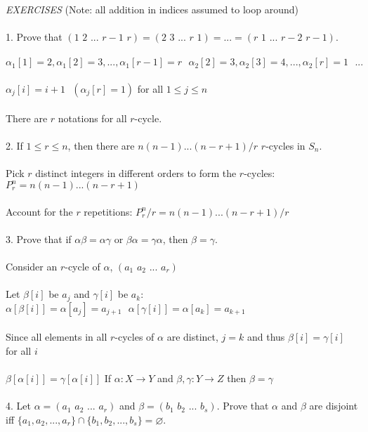 \documentclass{article}
\begin{document}
\begin{siderules}
\color{blue}\textit{EXERCISES} (Note: all addition in indices assumed to loop around)\\\\
\color{blue}1. Prove that \((1\,\,2\,\,...\,\,r-1\,\,r)=(2\,\,3\,\,...\,\,r\,\,1)=...=(r\,\,1\,\,...\,\,r-2\,\,r-1)\).\color{black}\\\\
\null\qquad\(\alpha_1[1]=2,\alpha_1[2]=3,...,\alpha_1[r-1]=r\,\,\,\,\alpha_2[2]=3,\alpha_2[3]=4,...,\alpha_2[r]=1\,\,\,\,...\)\\\\
\null\qquad\(\alpha_j[i]=i+1\,\,\,\,(\alpha_j[r]=1)\) for all \(1\le j\le n\)\\\\
\null\qquad There are \(r\) notations for all \(r\)-cycle.\\\\
\color{blue}2. If \(1\le r\le n\), then there are \(n(n-1)...(n-r+1)/r\) \(r\)-cycles in \(S_n\).\color{black}\\\\
\null\qquad Pick \(r\) distinct integers in different orders to form the \(r\)-cycles: \(P^n_r=n(n-1)...(n-r+1)\)\\\\
\null\qquad Account for the \(r\) repetitions: \(P^n_r/r=n(n-1)...(n-r+1)/r\)\\\\
\color{blue}3. Prove that if \(\alpha\beta=\alpha\gamma\) or \(\beta\alpha=\gamma\alpha\), then \(\beta=\gamma\).\color{black}\\\\
\null\qquad Consider an \(r\)-cycle of \(\alpha\), \((a_1\,\,a_2\,\,...\,\,a_r)\)\\\\
\null\qquad Let \(\beta[i]\) be \(a_j\) and \(\gamma[i]\) be \(a_k\): \(\alpha[\beta[i]]=\alpha[a_j]=a_{j+1}\,\,\,\,\alpha[\gamma[i]]=\alpha[a_k]=a_{k+1}\)\\\\
\null\qquad Since all elements in all \(r\)-cycles of \(\alpha\) are distinct, \(j=k\) and thus \(\beta[i]=\gamma[i]\) for all \(i\)\\\\
\null\qquad\(\beta[\alpha[i]]=\gamma[\alpha[i]]\) If \(\alpha: X\rightarrow Y\) and \(\beta,\gamma: Y\rightarrow Z\) then \(\beta=\gamma\)\\\\
\color{blue}4. Let \(\alpha=(a_1\,\,a_2\,\,...\,\,a_r)\) and \(\beta=(b_1\,\,b_2\,\,...\,\,b_s)\). Prove that \(\alpha\) and \(\beta\) are disjoint iff \(\{a_1,a_2,...,a_r\}\cap\{b_1,b_2,...,b_s\}=\varnothing\).\color{black}\\\\

\end{siderules}
\end{document}
